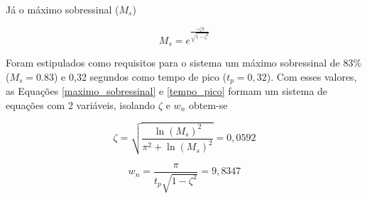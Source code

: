 Já o máximo sobressinal ($M_s$)

\begin{equation}
    M_s=e^\frac{-\zeta \pi}{\sqrt{1-\zeta^2}}
    \label{maximo_sobressinal}
\end{equation}

Foram estipulados como requisitos para o sistema um máximo sobressinal de 83\% ($M_s=0.83$) e 0,32 segundos como tempo de pico ($t_p=0,32$). Com esses valores, as Equações \ref{maximo_sobressinal} e \ref{tempo_pico} formam um sistema de equações com 2 variáveis, isolando $\zeta$ e $w_n$ obtem-se

\begin{equation}
    \zeta = \sqrt{\frac{\ln(M_s)^2}{\pi^2+\ln(M_s)^2}} =  0,0592
    \label{zeta}
\end{equation}

\begin{equation}
    w_n = \frac{\pi}{t_p \sqrt{1-\zeta^2}} = 9,8347
    \label{wn}
\end{equation}